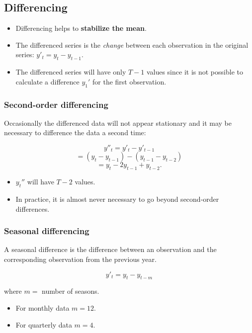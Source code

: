 \documentclass[]{book}
\providecommand{\tightlist}{%
  \setlength{\itemsep}{0pt}\setlength{\parskip}{0pt}}
\begin{document}
\hypertarget{differencing}{%
\subsection{Differencing}\label{differencing}}

\begin{itemize}
\tightlist
\item
  Differencing helps to \textbf{stabilize the mean}.
\item
  The differenced series is the \emph{change} between each observation in the original series: \(y'_t = y_t - y_{t-1}\).
\item
  The differenced series will have only \(T-1\) values since it is not possible to calculate a difference \(y_1'\) for the first observation.
\end{itemize}

\hypertarget{second-order-differencing}{%
\subsubsection{Second-order differencing}\label{second-order-differencing}}

Occasionally the differenced data will not appear stationary and it may be necessary to difference the data a second time:

\[y''_{t} = y'_{t} - y'_{t - 1}\]
\[= (y_t - y_{t-1}) - (y_{t-1}-y_{t-2})\]
\[= y_t - 2y_{t-1} +y_{t-2}.\]

\begin{itemize}
\tightlist
\item
  \(y_t''\) will have \(T-2\) values.
\item
  In practice, it is almost never necessary to go beyond second-order differences.
\end{itemize}

\hypertarget{seasonal-differencing}{%
\subsubsection{Seasonal differencing}\label{seasonal-differencing}}

A seasonal difference is the difference between an observation and the corresponding observation from the previous year.

\[y'_t = y_t - y_{t-m}\]

where \(m=\) number of seasons.

\begin{itemize}
\tightlist
\item
  For monthly data \(m=12\).
\item
  For quarterly data \(m=4\).
\end{itemize}
\end{document}
